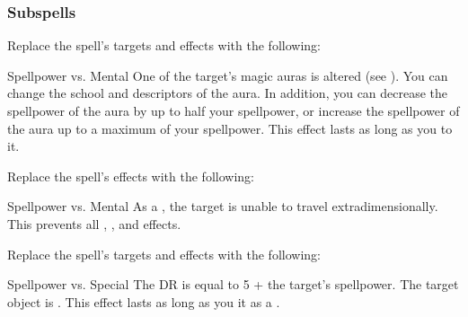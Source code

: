 \subsubsection{Subspells}
Replace the spell's targets and effects with the following:
\begin{spellcontent}
\begin{augmenttargetinginfo}
\end{augmenttargetinginfo}
\begin{augmenteffects}
\begin{spellattack}{Spellpower vs. Mental}
\spellsuccess
One of the target's magic auras is altered (see ).
You can change the school and descriptors of the aura.
In addition, you can decrease the spellpower of the aura by up to half your spellpower, or increase the spellpower of the aura up to a maximum of your spellpower.
This effect lasts as long as you  to it.
\end{spellattack}
\end{augmenteffects}
\end{spellcontent}
Replace the spell's effects with the following:
\begin{spellcontent}
\begin{augmenteffects}
\begin{spellattack}{Spellpower vs. Mental}
\spellsuccess
As a , the target is unable to travel extradimensionally.
This prevents all , , and  effects.
\end{spellattack}
\end{augmenteffects}
\end{spellcontent}
Replace the spell's targets and effects with the following:
\begin{spellcontent}
\begin{augmenttargetinginfo}
\end{augmenttargetinginfo}
\begin{augmenteffects}
\begin{spellattack}{Spellpower vs. Special}
\spellspecial
The DR is equal to 5 + the target's spellpower.
\spellsuccess
The target object is .
This effect lasts as long as you  it as a .
\end{spellattack}
\end{augmenteffects}
\end{spellcontent}

